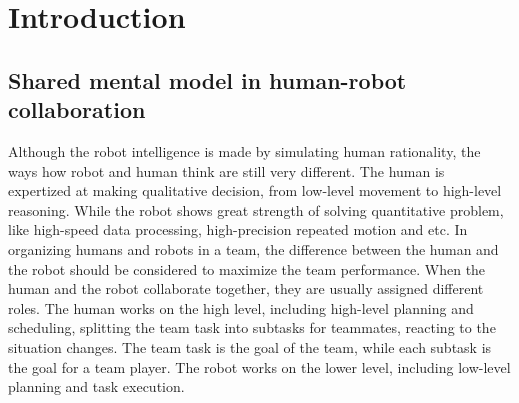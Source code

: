 \documentclass[phd]{byuprop}
\title{\Title}
\author{\Author}
\begin{document}
\maketitle

\section{Introduction}

\subsection{Shared mental model in human-robot collaboration}

Although the robot intelligence is made by simulating human rationality, the ways how robot and human think are still very different.
The human is expertized at making qualitative decision, from low-level movement to high-level reasoning.
While the robot shows great strength of solving quantitative problem, like high-speed data processing, high-precision repeated motion and etc.
In organizing humans and robots in a team, the difference between the human and the robot should be considered to maximize the team performance.
When the human and the robot collaborate together, they are usually assigned different roles.
The human works on the high level, including high-level planning and scheduling, splitting the team task into subtasks for teammates, reacting to the situation changes.
The team task is the goal of the team, while each subtask is the goal for a team player.  
The robot works on the lower level, including low-level planning and task execution.
\end{document}
